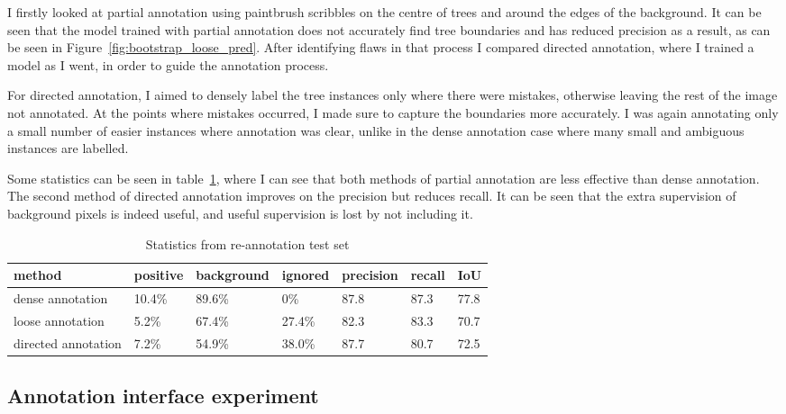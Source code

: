 I firstly looked at partial annotation using paintbrush scribbles on the centre of trees and around the edges of the background. It can be seen that the model trained with partial annotation does not accurately find tree boundaries and has reduced precision as a result, as can be seen in Figure~\ref{fig:bootstrap_loose_pred}. After identifying flaws in that process I compared directed annotation, where I trained a model as I went, in order to guide the annotation process.

For directed annotation, I aimed to densely label the tree instances only where there were mistakes, otherwise leaving the rest of the image not annotated. At the points where mistakes occurred, I made sure to capture the boundaries more accurately. I was again annotating only a small number of easier instances where annotation was clear, unlike in the dense annotation case where many small and ambiguous instances are labelled.

Some statistics can be seen in table~\ref{tab:loose_exp}, where I can see that both methods of partial annotation are less effective than dense annotation. The second method of directed annotation improves on the precision but reduces recall. It can be seen that the extra supervision of background pixels is indeed useful, and useful supervision is lost by not including it.


\begin{table}[!ht]
  \centering
    \caption{Statistics from re-annotation test set}
    
  \begin{tabular}{ l  l  l l l l l }
    method & positive & background & ignored & precision & recall & IoU  \\
    \toprule
    dense annotation    & 10.4\% & 89.6\% & 0\% & 87.8 & 87.3 & 77.8 \\
    loose annotation    & 5.2\% & 67.4\% & 27.4\% & 82.3 & 83.3 & 70.7 \\
    directed annotation & 7.2\% & 54.9\% & 38.0\% & 87.7 & 80.7 & 72.5 \\    
    \bottomrule
  \end{tabular}

\label{tab:loose_exp}
\end{table}

\subsection {Annotation interface experiment}

